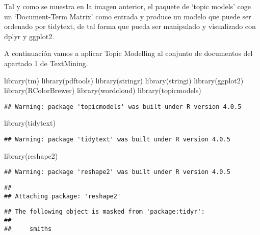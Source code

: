 \documentclass[
]{book}
\newenvironment{Shaded}{\begin{snugshade}}{\end{snugshade}}
\newcommand{\FunctionTok}[1]{\textcolor[rgb]{0.00,0.00,0.00}{#1}}
\newcommand{\NormalTok}[1]{#1}
\begin{document}
Tal y como se muestra en la imagen anterior, el paquete de `topic models' coge un `Document-Term Matrix' como entrada y produce un modelo que puede ser ordenado por tidytext, de tal forma que pueda ser manipulado y visualizado con dplyr y ggplot2.

A continuación vamos a aplicar Topic Modelling al conjunto de documentos del apartado 1 de TextMining.

\begin{Shaded}
\begin{Highlighting}[]
\FunctionTok{library}\NormalTok{(tm)}
\FunctionTok{library}\NormalTok{(pdftools)}
\FunctionTok{library}\NormalTok{(stringr)}
\FunctionTok{library}\NormalTok{(stringi)}
\FunctionTok{library}\NormalTok{(ggplot2)}
\FunctionTok{library}\NormalTok{(RColorBrewer)}
\FunctionTok{library}\NormalTok{(wordcloud)}
\FunctionTok{library}\NormalTok{(topicmodels)}
\end{Highlighting}
\end{Shaded}

\begin{verbatim}
## Warning: package 'topicmodels' was built under R version 4.0.5
\end{verbatim}

\begin{Shaded}
\begin{Highlighting}[]
\FunctionTok{library}\NormalTok{(tidytext)}
\end{Highlighting}
\end{Shaded}

\begin{verbatim}
## Warning: package 'tidytext' was built under R version 4.0.5
\end{verbatim}

\begin{Shaded}
\begin{Highlighting}[]
\FunctionTok{library}\NormalTok{(reshape2)}
\end{Highlighting}
\end{Shaded}

\begin{verbatim}
## Warning: package 'reshape2' was built under R version 4.0.5
\end{verbatim}

\begin{verbatim}
## 
## Attaching package: 'reshape2'
\end{verbatim}

\begin{verbatim}
## The following object is masked from 'package:tidyr':
## 
##     smiths
\end{verbatim}
\end{document}
